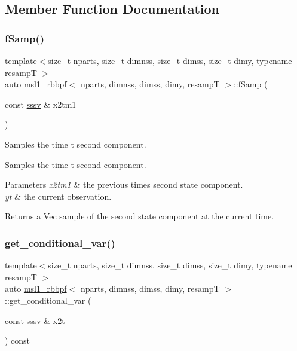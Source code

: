\subsection{Member Function Documentation}
\mbox{\label{classmsl1__rbbpf_a45c6dc4e6b66b091245000e5a59605f5}} 
\subsubsection{\texorpdfstring{f\+Samp()}{fSamp()}}
{\footnotesize\ttfamily template$<$size\+\_\+t nparts, size\+\_\+t dimnss, size\+\_\+t dimss, size\+\_\+t dimy, typename resampT $>$ \\
auto \hyperlink{classmsl1__rbbpf}{msl1\+\_\+rbbpf}$<$ nparts, dimnss, dimss, dimy, resampT $>$\+::f\+Samp (\begin{DoxyParamCaption}\item[{const \hyperlink{classmsl1__rbbpf_a6703c548bb85bbe8e5a6baa723e8f0bb}{sssv} \&}]{x2tm1 }\end{DoxyParamCaption})}



Samples the time t second component. 

Samples the time t second component. 
\begin{DoxyParams}{Parameters}
{\em x2tm1} & the previous time\textquotesingle{}s second state component. \\
\hline
{\em yt} & the current observation. \\
\hline
\end{DoxyParams}
\begin{DoxyReturn}{Returns}
a Vec sample of the second state component at the current time. 
\end{DoxyReturn}
\mbox{\label{classmsl1__rbbpf_ad9ae963432618014085777d34f73040d}} 
\subsubsection{\texorpdfstring{get\+\_\+conditional\+\_\+var()}{get\_conditional\_var()}}
{\footnotesize\ttfamily template$<$size\+\_\+t nparts, size\+\_\+t dimnss, size\+\_\+t dimss, size\+\_\+t dimy, typename resampT $>$ \\
auto \hyperlink{classmsl1__rbbpf}{msl1\+\_\+rbbpf}$<$ nparts, dimnss, dimss, dimy, resampT $>$\+::get\+\_\+conditional\+\_\+var (\begin{DoxyParamCaption}\item[{const \hyperlink{classmsl1__rbbpf_a6703c548bb85bbe8e5a6baa723e8f0bb}{sssv} \&}]{x2t }\end{DoxyParamCaption}) const}



